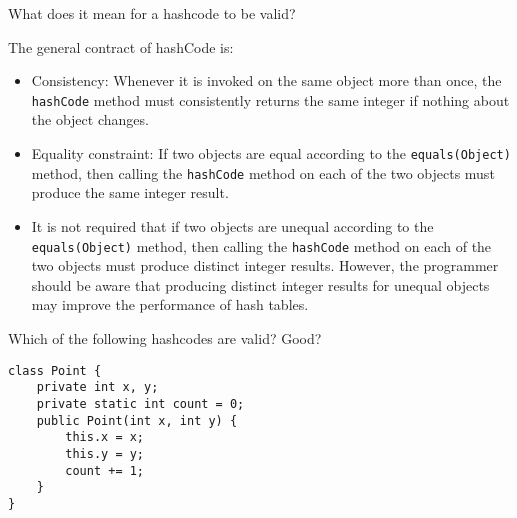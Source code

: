 \question What does it mean for a hashcode to be valid?
\begin{solution}[0.75in]
The general contract of hashCode is:
\begin{itemize}
\item Consistency: Whenever it is invoked on the same object more than once,
the \lstinline$hashCode$ method must consistently returns the same integer if
nothing about the object changes.
\item Equality constraint: If two objects are equal according to the
\lstinline$equals(Object)$ method, then calling the \lstinline$hashCode$ method
on each of the two objects must produce the same integer result.
\item It is not required that if two objects are unequal according to the
\lstinline$equals(Object)$ method, then calling the \lstinline$hashCode$ method
on each of the two objects must produce distinct integer results. However, the
programmer should be aware that producing distinct integer results for unequal
objects may improve the performance of hash tables.
\end{itemize}
\end{solution}

\question Which of the following hashcodes are valid? Good?

\begin{lstlisting}
class Point {
    private int x, y;
    private static int count = 0;
    public Point(int x, int y) {
        this.x = x;
        this.y = y;
        count += 1;
    }
}
\end{lstlisting}

